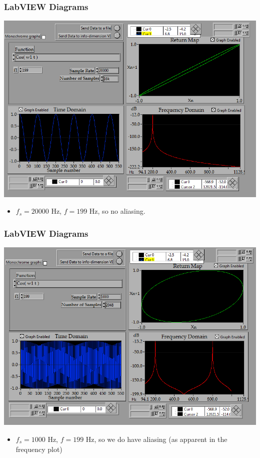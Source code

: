 \documentclass[9pt]{beamer}
\begin{document}

\begin{frame}
	\frametitle{LabVIEW Diagrams}

	\begin{center}
		\includegraphics[scale=0.4]{images/nlsim_f_199_fs_20000_N_16k.PNG}
	\end{center}
	\begin{itemize}
		\item \( f_s = 20000 \) Hz, \( f = 199 \) Hz, so no aliasing. 
	\end{itemize}
\end{frame}

\begin{frame}
	\frametitle{LabVIEW Diagrams}

	\begin{center}
		\includegraphics[scale=0.4]{images/nlsim_f_199_fs_1000.PNG}
	\end{center}
	\begin{itemize}
		\item \( f_s = 1000 \) Hz, \( f = 199 \) Hz, so we do have aliasing (as
			apparent in the frequency plot) 
	\end{itemize}
\end{frame}
\end{document}
